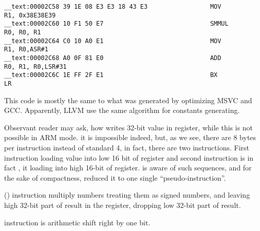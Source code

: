 \begin{lstlisting}
__text:00002C58 39 1E 08 E3 E3 18 43 E3                 MOV             R1, 0x38E38E39
__text:00002C60 10 F1 50 E7                             SMMUL           R0, R0, R1
__text:00002C64 C0 10 A0 E1                             MOV             R1, R0,ASR#1
__text:00002C68 A0 0F 81 E0                             ADD             R0, R1, R0,LSR#31
__text:00002C6C 1E FF 2F E1                             BX              LR
\end{lstlisting}

{This code is mostly the same to what was generated by optimizing MSVC and GCC.}
{Apparently, LLVM use the same algorithm for constants generating.}

{Observant reader may ask, how \MOV writes 32-bit value in register, while this is not possible in ARM mode.}
{it is impossible indeed, but, as we see,
there are 8 bytes per instruction instead of standard 4,
in fact, there are two instructions.}
{First instruction loading  value into low 16 bit of register and second instruction is in fact
, it loading  into high 16-bit of register.}
\IDA {}
{is aware of such sequences, and for the sake of compactness, reduced it to one single ``pseudo-instruction''.}

 () 
{instruction multiply numbers treating them as signed numbers,
and leaving high 32-bit part of result in the  register,
dropping low 32-bit part of result.}

 
{instruction is arithmetic shift right by one bit.}

